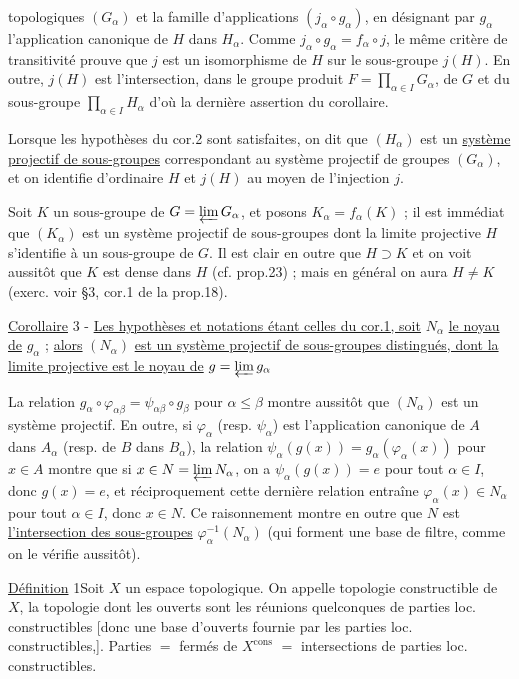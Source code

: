 topologiques $(G_\alpha)$ et la famille d'applications $(j_\alpha\circ g_\alpha)$, en désignant par $g_\alpha$ l'application canonique de $H$ dans $H_\alpha$. Comme $j_\alpha\circ g_\alpha=f_\alpha\circ j$, le même critère de transitivité prouve que $j$ est un isomorphisme de $H$ sur le sous-groupe $j(H)$. En outre, $j(H)$ est l'intersection, dans le groupe produit $F=\prod_{\alpha\in I}G_\alpha$, de $G$ et du sous-groupe $\prod_{\alpha\in I}H_\alpha$ d'où la dernière assertion du corollaire.

Lorsque les hypothèses du cor.2 sont satisfaites, on dit que $(H_\alpha)$ est un \uline{système projectif de sous-groupes} correspondant au système projectif de groupes $(G_\alpha)$, et on identifie d'ordinaire $H$ et $j(H)$ au moyen de l'injection $j$.

Soit $K$ un sous-groupe de $G=\varprojlim G_\alpha$, et posons $K_\alpha=f_\alpha(K)$ ; il est immédiat que $(K_\alpha)$ est un système projectif de sous-groupes dont la limite projective $H$ s'identifie à un sous-groupe de $G$. Il est clair en outre que $H\supset K$ et on voit aussitôt que $K$ est dense dans $H$ (cf. prop.23) ; mais en général on aura $H\neq K$ (exerc. voir §3, cor.1 de la prop.18).

\uline{Corollaire} 3 - \uline{Les hypothèses et notations étant celles du cor.1, soit} $N_\alpha$ \uline{le noyau de} $g_\alpha$ ; \uline{alors} $(N_\alpha)$ \uline{est un système projectif de sous-groupes distingués, dont la limite projective est le noyau de} $g=\varprojlim g_\alpha$

La relation $g_\alpha\circ\varphi_{\alpha\beta}=\psi_{\alpha\beta}\circ g_\beta$ pour $\alpha\leq\beta$ montre aussitôt que $(N_\alpha)$ est un système projectif. En outre, si $\varphi_\alpha$ (resp. $\psi_\alpha$) est l'application canonique de $A$ dans $A_\alpha$ (resp. de $B$ dans $B_\alpha$), la relation $\psi_\alpha(g(x))=g_\alpha(\varphi_\alpha(x))$ pour $x\in A$ montre que si $x\in N=\varprojlim N_\alpha$, on a $\psi_\alpha(g(x))=e$ pour tout $\alpha\in I$, donc $g(x)=e$, et réciproquement cette dernière relation entraîne $\varphi_\alpha(x)\in N_\alpha$ pour tout $\alpha\in I$, donc $x\in N$. Ce raisonnement montre en outre que $N$ est \uline{l'intersection des sous-groupes} $\varphi_\alpha^{-1}(N_\alpha)$ (qui forment une base de filtre, comme on le vérifie aussitôt).


\uline{Définition} 1\quad Soit $X$ un espace topologique. On appelle topologie constructible de $X$,  la topologie dont les ouverts sont les réunions quelconques de parties loc. constructibles [donc une base d'ouverts fournie par les parties loc. constructibles,]. Parties  $=$ fermés de $X^{\mathrm{cons}}$ $=$ intersections de parties loc. constructibles.

